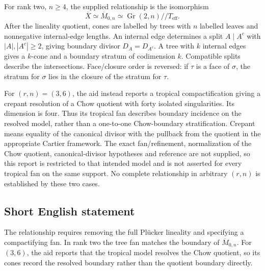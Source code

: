 \documentclass[11pt]{article}
\begin{document}
For rank two, \(n\geq4\), the supplied relationship is the isomorphism
\[
 \overline X\simeq\overline M_{0,n}
 \simeq\operatorname{Gr}(2,n)//T_{\mathrm{eff}}.
\]
After the lineality quotient, cones are labelled by trees with \(n\) labelled leaves and nonnegative internal-edge lengths. An internal edge determines a split \(A\mid A^c\) with \(|A|,|A^c|\geq2\), giving boundary divisor \(D_A=D_{A^c}\). A tree with \(k\) internal edges gives a \(k\)-cone and a boundary stratum of codimension \(k\). Compatible splits describe the intersections. Face/closure order is reversed: if \(\tau\) is a face of \(\sigma\), the stratum for \(\sigma\) lies in the closure of the stratum for \(\tau\).

For \((r,n)=(3,6)\), the aid instead reports a tropical compactification giving a crepant resolution of a Chow quotient with forty isolated singularities. Its dimension is four. Thus its tropical fan describes boundary incidence on the resolved model, rather than a one-to-one Chow-boundary stratification. Crepant means equality of the canonical divisor with the pullback from the quotient in the appropriate Cartier framework. The exact fan/refinement, normalization of the Chow quotient, canonical-divisor hypotheses and reference are not supplied, so this report is restricted to that intended model and is not asserted for every tropical fan on the same support. No complete relationship in arbitrary \((r,n)\) is established by these two cases.
\subsection{Short English statement}
The relationship requires removing the full Plücker lineality and specifying a compactifying fan. In rank two the tree fan matches the boundary of \(\overline M_{0,n}\). For \((3,6)\), the aid reports that the tropical model resolves the Chow quotient, so its cones record the resolved boundary rather than the quotient boundary directly.
\end{document}
